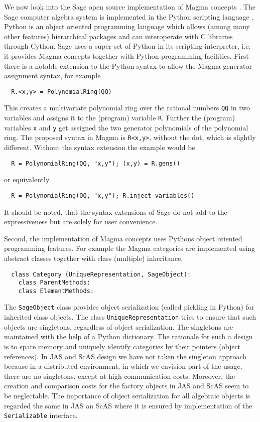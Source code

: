 \documentclass{llncs}
\newcommand{\code}[1]{\texttt{#1}}
\begin{document}
We now look into the Sage open source implementation of Magma concepts
\cite{Stein:2005,SageWiki:2009}.  The Sage computer algebra system is
implemented in the Python scripting language \cite{vanRossum:1991}.
Python is an object oriented programming language which allows (among
many other features) hierarchical packages and can interoperate with C
libraries through Cython. Sage uses a super-set of Python in its
scripting interpreter, i.e. it provides Magma concepts together with
Python programming facilities. First there is a notable extension to
the Python syntax to allow the Magma generator assignment syntax, for
example
\begin{verbatim}
  R.<x,y> = PolynomialRing(QQ)
\end{verbatim}
This creates a multivariate polynomial ring over the rational numbers
\code{QQ} in two variables and assigns it to the (program) variable
\code{R}. Further the (program) variables \code{x} and \code{y} get
assigned the two generator polynomials of the polynomial ring. The
proposed syntax in Magma is \code{R<x,y>}, without the dot, which is
slightly different.  Without the syntax extension the example
would be
\begin{verbatim}
  R = PolynomialRing(QQ, "x,y"); (x,y) = R.gens()
\end{verbatim}
or equivalently
\begin{verbatim}
  R = PolynomialRing(QQ, "x,y"); R.inject_variables()
\end{verbatim}
It should be noted, that the syntax extensions of Sage do not add to
the expressiveness but are solely for user convenience.

Second, the implementation of Magma concepts uses Pythons object oriented
programming features. For example the Magma categories are implemented
using abstract classes together with class (multiple) inheritance.
\begin{verbatim}
  class Category (UniqueRepresentation, SageObject):
    class ParentMethods:
    class ElementMethods:
\end{verbatim}
The \code{SageObject} class provides object serialization (called
pickling in Python) for inherited class objects. The class
\code{UniqueRepresentation} tries to ensure that such objects are
singletons, regardless of object serialization. The singletons are
maintained with the help of a Python dictionary.  The rationale for
such a design is to spare memory and uniquely identify categories by
their pointers (object references). 
%
In JAS and ScAS design we have not taken the singleton approach
because in a distributed environment, in which we envision part of the
usage, there are no singletons, except at high communication costs.
Moreover, the creation and comparison costs for the factory objects in
JAS and ScAS seem to be neglectable. The importance of object
serialization for all algebraic objects is regarded the same in JAS an
ScAS where it is ensured by implementation of the \code{Serializable}
interface.
\end{document}

